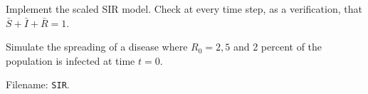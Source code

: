 \documentclass[graybox,sectrefs,envcountresetchap,open=right,final]{svmonodo}
\newenvironment{doconceexercise}{}{}
\begin{document}
\begin{doconceexercise}



Implement the scaled SIR model. Check at every time step,
as a verification, that
$\bar S + \bar I + \bar R = 1$.



Simulate the spreading of a disease where $R_0=2, 5$ and 2 percent of
the population is infected at time $t=0$.



\noindent Filename: \texttt{SIR}.

\end{doconceexercise}
\end{document}
